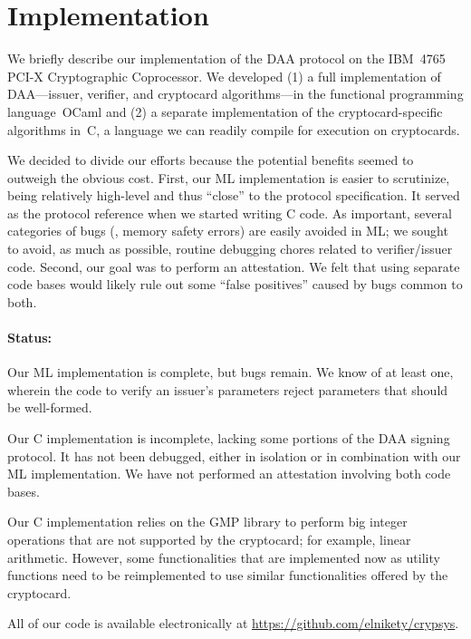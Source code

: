 \section{Implementation}

We briefly describe our implementation of the DAA protocol on the IBM~4765
PCI-X Cryptographic Coprocessor.
We developed (1) a
full implementation of DAA---issuer, verifier, and cryptocard algorithms---in the
functional programming language~OCaml and (2) a separate implementation of the cryptocard-specific algorithms in~C, a language we can readily compile
for execution on cryptocards.

We decided to divide our efforts because the potential benefits seemed to outweigh
the obvious cost.
First, our ML implementation is easier to
scrutinize, being relatively high-level and thus ``close'' to the protocol specification.
It served as the protocol reference when we started writing C code.
As important, several categories of bugs (\eg, memory safety errors) are easily avoided in ML;
we sought to avoid, as much as possible, routine debugging chores related to verifier/issuer code.
Second, our goal was to perform an attestation.
We felt that using separate code bases
would likely rule out some ``false positives'' caused
by bugs common to both.

\paragraph*{Status:}
Our ML implementation is complete, but bugs remain.
We know of at least one, wherein the code to verify an issuer's parameters
reject parameters that should be well-formed.

Our C implementation is incomplete, lacking some portions of
the DAA signing protocol. It has not been debugged, either in isolation
or in combination with our ML implementation. We have
not performed an attestation involving both code bases.

Our C implementation relies on the GMP library
to perform big integer operations that are not supported by the
cryptocard; for example, linear arithmetic. However, some functionalities that are
implemented now as utility functions need to be reimplemented to use similar
functionalities offered by the cryptocard.

All of our code is available electronically at
\url{https://github.com/elnikety/crypsys}.
